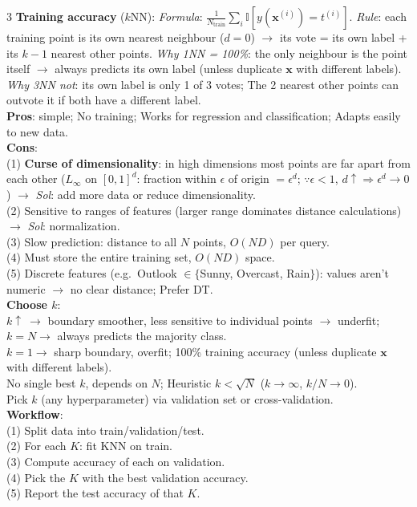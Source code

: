\documentclass[10pt]{article}
\newcommand{\ind}{\mathbb{I}}
\newcommand{\vx}{\mathbf{x}}
\newcommand{\sub}[1]{\textit{#1}:}  %
\begin{document}
\begin{multicols*}{3}
\textbf{Training accuracy} ($k$NN): \sub{Formula} $\tfrac{1}{N_{\text{train}}}\sum_{i}\ind[y(\vx^{(i)})=t^{(i)}]$. \sub{Rule} each training point is its own nearest neighbour ($d=0$) $\to$ its vote = its own label + its $k\!-\!1$ nearest other points.
\sub{Why 1NN = 100\%} the only neighbour is the point itself $\to$ always predicts its own label (unless duplicate $\vx$ with different labels).
\sub{Why 3NN not} its own label is only 1 of 3 votes; The 2 nearest other points can outvote it if both have a different label.\\
\textbf{Pros}: simple; No training; Works for regression and classification; Adapts easily to new data.\\
\textbf{Cons}:\\
(1) \textbf{Curse of dimensionality}: in high dimensions most points are far apart from each other ($L_\infty$ on $[0,1]^d$: fraction within $\epsilon$ of origin $=\epsilon^d$; $\because\epsilon<1$, $d\uparrow\Rightarrow\epsilon^d\to0$) $\to$ \sub{Sol} add more data or reduce dimensionality.\\
(2) Sensitive to ranges of features (larger range dominates distance calculations) $\to$ \sub{Sol} normalization.\\
(3) Slow prediction: distance to all $N$ points, $O(ND)$ per query.\\
(4) Must store the entire training set, $O(ND)$ space.\\
(5) Discrete features (e.g.\ Outlook $\in\{$Sunny, Overcast, Rain$\}$): values aren't numeric $\to$ no clear distance; Prefer DT.\\
\textbf{Choose $k$}:\\
$k\uparrow\ \to$ boundary smoother, less sensitive to individual points $\to$ underfit; $k=N\to$ always predicts the majority class.\\
$k=1\to$ sharp boundary, overfit; 100\% training accuracy (unless duplicate $\vx$ with different labels).\\
No single best $k$, depends on $N$; Heuristic $k<\sqrt N$ ($k\to\infty$, $k/N\to0$).\\
Pick $k$ (any hyperparameter) via validation set or cross-validation.\\
\textbf{Workflow}:\\
(1) Split data into train/validation/test.\\
(2) For each $K$: fit KNN on train.\\
(3) Compute accuracy of each on validation.\\
(4) Pick the $K$ with the best validation accuracy.\\
(5) Report the test accuracy of that $K$.\\


\end{multicols*}
\end{document}

